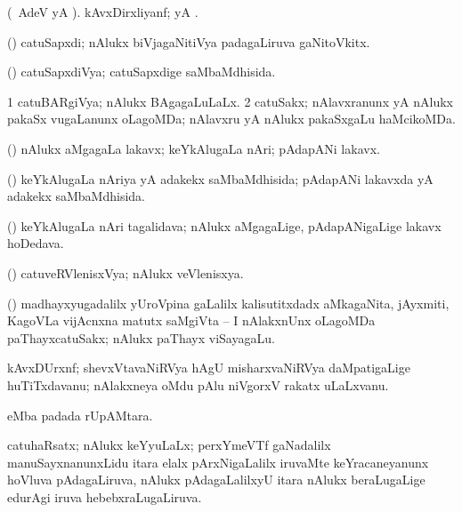 \bentry
{}
\gl{\nA}
\bmng
(\bava\ AdeV yA ). kAvxDirxliyanf;  yA . 
\emng
\eentry

\bentry
{}
\gl{\nA}
\bmng
(\ga) catuSapxdi; nAlukx biVjagaNitiVya padagaLiruva gaNitoVkitx. 
\emng
\eentry

\bentry
{}
\gl{\gu}
\bmng
(\ga) catuSapxdiVya; catuSapxdige saMbaMdhisida. 
\emng
\eentry

\bentry
{}
\gl{\gu}
\bmng
\bnum
\num{1} catuBARgiVya; nAlukx BAgagaLuLaLx. 
\num{2} catuSakx; nAlavxranunx yA nAlukx pakaSx \mo vugaLanunx oLagoMDa; nAlavxru yA nAlukx pakaSxgaLu haMcikoMDa. 
\enum
\emng
\eentry

\bentry
{}
\gl{\nA}
\bmng
(\veYshA) nAlukx aMgagaLa lakavx; keYkAlugaLa nAri; pAdapANi lakavx. 
\emng
\eentry

\bentry
{}
\gl{\gu}
\bmng
(\veYshA) keYkAlugaLa nAriya yA adakekx saMbaMdhisida; pAdapANi lakavxda yA adakekx saMbaMdhisida. 
\emng
\eentry

\bentry
{}
\gl{\nA}
\bmng
(\veYshA) keYkAlugaLa nAri tagalidava; nAlukx aMgagaLige, pAdapANigaLige lakavx hoDedava. 
\emng
\eentry

\bentry
{}
\gl{\gu}
\bmng
(\ravi) catuveRVlenisxVya; nAlukx veVlenisxya. 
\emng
\eentry


\bentry
{}
\gl{\nA}
\bmng
(\ca) madhayxyugadalilx yUroVpina \vivi gaLalilx kalisutitxdadx aMkagaNita, jAyxmiti, KagoVLa vijAcnxna matutx saMgiVta -- I nAlakxnUnx oLagoMDa paThayxcatuSakx; nAlukx paThayx viSayagaLu. 
\emng
\eentry


\bentry
{}
\gl{\nA}
\bmng
kAvxDUrxnf; shevxVtavaNiRVya hAgU misharxvaNiRVya daMpatigaLige huTiTxdavanu; nAlakxneya oMdu pAlu niVgorxV rakatx uLaLxvanu. 
\emng
\eentry


\bentry
{}
\gl{\gu}
\bmng
{} eMba padada rUpAMtara. 
\emng
\eentry


\bentry
{}
\gl{\gu}
\bmng
catuhaRsatx; nAlukx keYyuLaLx; perxYmeVTf gaNadalilx manuSayxnanunxLidu itara elalx pArxNigaLalilx iruvaMte keYracaneyanunx hoVluva pAdagaLiruva, nAlukx pAdagaLalilxyU itara nAlukx beraLugaLige edurAgi iruva hebebxraLugaLiruva. 
\emng
\eentry

